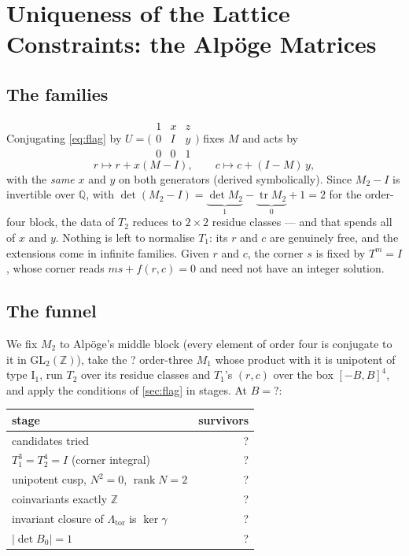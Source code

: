 \documentclass[11pt,a4paper]{article}
\newcommand{\SSBox}{?}\newcommand{\SSTried}{?}\newcommand{\SSOrders}{?}
\newcommand{\SSCusp}{?}\newcommand{\SSCoinv}{?}\newcommand{\SSClosure}{?}
\newcommand{\SSUnimod}{?}\newcommand{\SSMOneChoices}{?}
\newcommand{\ZZ}{\mathbb{Z}}
\newcommand{\QQ}{\mathbb{Q}}
\newcommand{\GL}{\mathrm{GL}}
\theoremstyle{plain}
\theoremstyle{definition}
\begin{document}

\section{Uniqueness of the Lattice Constraints: the Alpöge Matrices}
\label{sec:forced}

\subsection{The families}

Conjugating \eqref{eq:flag} by $U = \bigl(\begin{smallmatrix} 1 & x & z \\
0 & I & y \\ 0 & 0 & 1\end{smallmatrix}\bigr)$ fixes $M$ and acts by
\begin{equation}
  r \mapsto r + x(M - I), \qquad c \mapsto c + (I - M)\,y,
  \label{eq:action}
\end{equation}
with the \emph{same} $x$ and $y$ on both generators (derived symbolically).
Since $M_2 - I$ is invertible over $\QQ$, with
$\det(M_2-I)=\underbrace{\det M_2}_{1}-\underbrace{\operatorname{tr}M_2}_{0}+1=2$
for the order-four block, the data of $T_2$ reduces to $2 \times 2$ residue classes --- and that
spends all of $x$ and $y$. Nothing is left to normalise $T_1$: its $r$ and
$c$ are genuinely free, and the extensions come in infinite families.
Given $r$ and $c$, the corner $s$ is fixed by $T^m = I$, whose corner reads
$ms + f(r,c) = 0$ and need not have an integer solution.

\subsection{The funnel}

We fix $M_2$ to Alpöge's middle block (every element of order four is
conjugate to it in $\GL_2(\ZZ)$), take the \SSMOneChoices{} order-three
$M_1$ whose product with it is unipotent of type $\mathrm{I}_1$, run $T_2$
over its residue classes and $T_1$'s $(r, c)$ over the box $[-B, B]^4$, and
apply the conditions of \cref{sec:flag} in stages. At $B = \SSBox$:

\begin{center}
\small
\begin{tabular}{lr}
\toprule
stage & survivors \\
\midrule
candidates tried & \SSTried \\
$T_1^3 = T_2^4 = I$ (corner integral) & \SSOrders \\
unipotent cusp, $N^2 = 0$, $\operatorname{rank} N = 2$ & \SSCusp \\
coinvariants exactly $\ZZ$ & \SSCoinv \\
invariant closure of $\Lambda_{\mathrm{tor}}$ is $\ker\gamma$ & \SSClosure \\
$|\det B_0| = 1$ & \SSUnimod \\
\bottomrule
\end{tabular}
\end{center}
\end{document}
